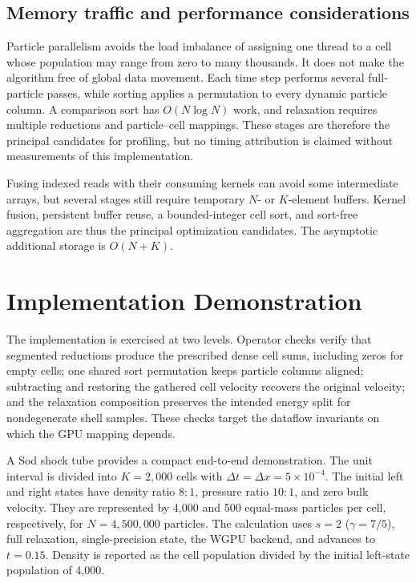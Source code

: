 \documentclass[a4paper,11pt]{article}
\begin{document}
\subsection{Memory traffic and performance considerations}

Particle parallelism avoids the load imbalance of assigning one thread to a
cell whose population may range from zero to many thousands.  It does not make
the algorithm free of global data movement.  Each time step performs several
full-particle passes, while sorting applies a permutation to every dynamic
particle column.  A comparison sort has $O(N\log N)$ work, and relaxation
requires multiple reductions and particle--cell mappings.  These stages are
therefore the principal candidates for profiling, but no timing attribution is
claimed without measurements of this implementation.

Fusing indexed reads with their consuming kernels can avoid some intermediate
arrays, but several stages still require temporary $N$- or $K$-element buffers.
Kernel fusion, persistent buffer reuse, a bounded-integer cell sort, and
sort-free aggregation are thus the principal optimization candidates.  The
asymptotic additional storage is $O(N+K)$.

\section{Implementation Demonstration}

The implementation is exercised at two levels.  Operator checks verify that
segmented reductions produce the prescribed dense cell sums, including zeros
for empty cells; one shared sort permutation keeps particle columns aligned;
subtracting and restoring the gathered cell velocity recovers the original
velocity; and the relaxation composition preserves the intended energy split
for nondegenerate shell samples.  These checks target the dataflow invariants
on which the GPU mapping depends.

A Sod shock tube \cite{sod1978} provides a compact end-to-end demonstration.
The unit interval is divided into $K=2{,}000$ cells with
$\Delta t=\Delta x=5\times10^{-4}$.  The initial left and right states have
density ratio $8:1$, pressure ratio $10:1$, and zero bulk velocity.  They are
represented by 4,000 and 500 equal-mass particles per cell, respectively, for
$N=4{,}500{,}000$ particles.  The calculation uses $s=2$
($\gamma=7/5$), full relaxation, single-precision state, the WGPU backend, and
advances to $t=0.15$.  Density is reported as the cell population divided by
the initial left-state population of 4,000.
\end{document}
